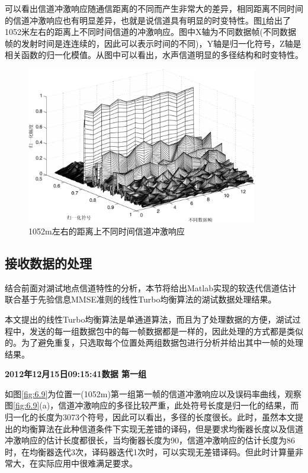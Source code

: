 可以看出信道冲激响应随通信距离的不同而产生非常大的差异，相同距离不同时间的信道冲激响应也有明显差异，也就是说信道具有明显的时变特性。图\ref{fig:6.8}给出了1052米左右的距离上不同时间信道的冲激响应。图中X轴为不同数据帧(不同数据帧的发射时间是连连续的，因此可以表示时间的不同)，Y轴是归一化符号，Z轴是相关函数的归一化模值。从图中可以看出，水声信道明显的多径结构和时变特性。
\begin{figure}[htb]
  \begin{center}
    \includegraphics[width=0.9\textwidth]{images/channelTime.pdf}
  \end{center}
  \caption{1052m左右的距离上不同时间信道冲激响应}
  \label{fig:6.8}
\end{figure}
\subsection{接收数据的处理}
结合前面对湖试地点信道特性的分析，本节将给出Matlab实现的软迭代信道估计联合基于先验信息MMSE准则的线性Turbo均衡算法的湖试数据处理结果。

本文提出的线性Turbo均衡算法是单通道算法，而且为了处理数据的方便，湖试过程中，发送的每一组数据包中的每一帧数据都是一样的，因此处理的方式都是类似的。为了避免重复，只选取每个位置处两组数据包进行分析并给出其中一帧的处理结果。

\textbf{\sihao 2012年12月15日09:15:41数据 第一组} 

如图\ref{fig:6.9}为位置一(1052m)第一组第一帧的信道冲激响应以及误码率曲线，观察图\ref{fig:6.9}(a)，信道冲激响应的多径比较严重，此处符号长度是归一化的结果，而归一化的长度为3073个符号，因此可以看出，多径的长度很长。此时，虽然本文提出的均衡算法在此种信道条件下实现无差错的译码，但是要求均衡器长度以及信道冲激响应的估计长度都很长，当均衡器长度为90，信道冲激响应的估计长度为86时，在均衡器迭代3次，译码器迭代1次时，可以实现无差错译码。但此时计算量非常大，在实际应用中很难满足要求。


